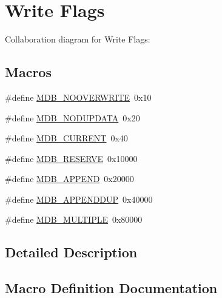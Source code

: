 \hypertarget{group__mdb__put}{}\section{Write Flags}
\label{group__mdb__put}
Collaboration diagram for Write Flags\+:
\subsection*{Macros}
\begin{DoxyCompactItemize}
\item 
\#define \mbox{\hyperlink{group__mdb__put_ga23eb9813f9a4cdf7a7da5e01815b0cfb}{M\+D\+B\+\_\+\+N\+O\+O\+V\+E\+R\+W\+R\+I\+TE}}~0x10
\item 
\#define \mbox{\hyperlink{group__mdb__put_ga8d723ae10cf0afdc771ce5eafa8f6c9e}{M\+D\+B\+\_\+\+N\+O\+D\+U\+P\+D\+A\+TA}}~0x20
\item 
\#define \mbox{\hyperlink{group__mdb__put_ga92f7832a496213db0f03105e6fa9afae}{M\+D\+B\+\_\+\+C\+U\+R\+R\+E\+NT}}~0x40
\item 
\#define \mbox{\hyperlink{group__mdb__put_gac0545c6aea719991e3eae6ccc686efcc}{M\+D\+B\+\_\+\+R\+E\+S\+E\+R\+VE}}~0x10000
\item 
\#define \mbox{\hyperlink{group__mdb__put_ga06af7a6e87588fd723e2dd1d7e580e6a}{M\+D\+B\+\_\+\+A\+P\+P\+E\+ND}}~0x20000
\item 
\#define \mbox{\hyperlink{group__mdb__put_ga0583fe408057ff1c03b8dd071c0d68d2}{M\+D\+B\+\_\+\+A\+P\+P\+E\+N\+D\+D\+UP}}~0x40000
\item 
\#define \mbox{\hyperlink{group__mdb__put_ga67a8d26a8c8bc56f02f2e03fd07a74b0}{M\+D\+B\+\_\+\+M\+U\+L\+T\+I\+P\+LE}}~0x80000
\end{DoxyCompactItemize}


\subsection{Detailed Description}


\subsection{Macro Definition Documentation}
\mbox{\label{group__mdb__put_ga06af7a6e87588fd723e2dd1d7e580e6a}} 
